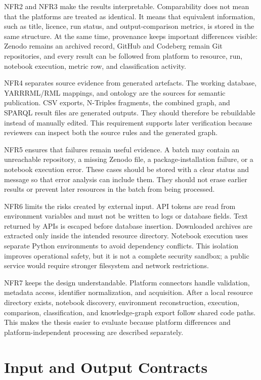 NFR2 and NFR3 make the results interpretable. Comparability does not mean that the platforms are treated as identical. It means that equivalent information, such as title, licence, run status, and output-comparison metrics, is stored in the same structure. At the same time, provenance keeps important differences visible: Zenodo remains an archived record, GitHub and Codeberg remain Git repositories, and every result can be followed from platform to resource, run, notebook execution, metric row, and classification activity.

NFR4 separates source evidence from generated artefacts. The working database, YARRRML/RML mappings, and ontology are the sources for semantic publication. CSV exports, N-Triples fragments, the combined graph, and SPARQL result files are generated outputs. They should therefore be rebuildable instead of manually edited. This requirement supports later verification because reviewers can inspect both the source rules and the generated graph.

NFR5 ensures that failures remain useful evidence. A batch may contain an unreachable repository, a missing Zenodo file, a package-installation failure, or a notebook execution error. These cases should be stored with a clear status and message so that error analysis can include them. They should not erase earlier results or prevent later resources in the batch from being processed.

NFR6 limits the risks created by external input. API tokens are read from environment variables and must not be written to logs or database fields. Text returned by APIs is escaped before database insertion. Downloaded archives are extracted only inside the intended resource directory. Notebook execution uses separate Python environments to avoid dependency conflicts. This isolation improves operational safety, but it is not a complete security sandbox; a public service would require stronger filesystem and network restrictions.

NFR7 keeps the design understandable. Platform connectors handle validation, metadata access, identifier normalization, and acquisition. After a local resource directory exists, notebook discovery, environment reconstruction, execution, comparison, classification, and knowledge-graph export follow shared code paths. This makes the thesis easier to evaluate because platform differences and platform-independent processing are described separately.

\section{Input and Output Contracts}

